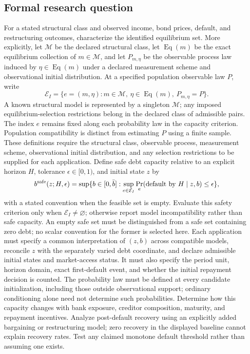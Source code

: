 \documentclass[11pt,a4paper]{article}
\begin{document}
\subsection*{Formal research question}

For a stated structural class and observed income, bond prices, default, and restructuring outcomes, characterize the identified equilibrium set. More explicitly, let $\mathcal M$ be the declared structural class, let $\operatorname{Eq}(m)$ be the exact equilibrium collection of $m\in\mathcal M$, and let $P_{m,\eta}$ be the observable process law induced by $\eta\in\operatorname{Eq}(m)$ under a declared measurement scheme and observational initial distribution. At a specified population observable law $P$, write
\[
\mathcal E_I=\{e=(m,\eta):m\in\mathcal M,\ \eta\in\operatorname{Eq}(m),\ P_{m,\eta}=P\}.
\]
A known structural model is represented by a singleton $\mathcal M$; any imposed equilibrium-selection restrictions belong in the declared class of admissible pairs. The index $e$ remains fixed along each probability law in the capacity criterion. Population compatibility is distinct from estimating $P$ using a finite sample. These definitions require the structural class, observable process, measurement scheme, observational initial distribution, and any selection restrictions to be supplied for each application. Define safe debt capacity relative to an explicit horizon $H$, tolerance $\epsilon\in[0,1)$, and initial state $z$ by
\[
b^{\rm safe}(z;H,\epsilon)=\sup\{b\in[0,\bar b]:
 \sup_{e\in\mathcal E_I}\Pr_e(\text{default by }H\mid z,b)\le\epsilon\},
\]
with a stated convention when the feasible set is empty. Evaluate this safety criterion only when $\mathcal E_I\ne\varnothing$; otherwise report model incompatibility rather than safe capacity. An empty safe set must be distinguished from a safe set containing zero debt; no scalar convention for the former is selected here. Each application must specify a common interpretation of $(z,b)$ across compatible models, reconcile $z$ with the separately varied debt coordinate, and declare admissible initial states and market-access status. It must also specify the period unit, horizon domain, exact first-default event, and whether the initial repayment decision is counted. The probability law must be defined at every candidate initialization, including those outside observational support; ordinary conditioning alone need not determine such probabilities. Determine how this capacity changes with bank exposure, creditor composition, maturity, and repayment incentives. Analyze post-default recovery using an explicitly added bargaining or restructuring model; zero recovery in the displayed baseline cannot explain recovery rates. Test any claimed monotone default threshold rather than assuming one exists.
\end{document}
